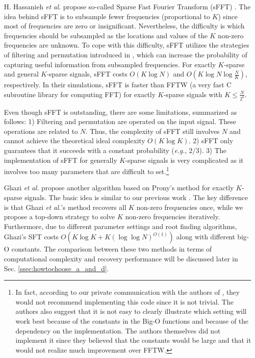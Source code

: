\documentclass[journal,onecolumn,11pt]{IEEEtran}
\begin{document}
H. Hassanieh {\em et al.} propose so-called Sparse Fast Fourier Transform (sFFT) \cite{Haitham2012}\cite{Haitham2012_1}. The idea behind sFFT is to subsample fewer frequencies (proportional to $K$) since most of frequencies are zero or insignificant.
Nevertheless, the difficulty is which frequencies should be subsampled as the locations and values of the $K$ non-zero frequencies are unknown. To cope with this difficulty, sFFT utilizes the strategies of filtering and permutation introduced in \cite{Gilbert2005}, which can increase the probability of capturing useful information from subsampled frequencies.
For exactly $K$-sparse and general $K$-sparse signals, sFFT costs $O (K \log N)$ and $O (K \log N \log \frac{N}{K})$, respectively.
In their simulations, sFFT is faster than FFTW \cite{Frigo2005} (a very fast C subroutine library for computing FFT) for exactly $K$-sparse signals with $K\leq\frac{N}{2^{6}}$.


Even though sFFT \cite{Haitham2012}\cite{Haitham2012_1} is outstanding, there are some limitations, summarized as follows:
1) Filtering and permutation are operated on the input signal. These operations are related to $N$.
Thus, the complexity of sFFT still involves $N$ and cannot achieve the theoretical ideal complexity $O(K \log K)$.
2) sFFT only guarantees that it succeeds with a constant probability ({\em e.g.}, $2/3$).
3) The implementation of sFFT for generally $K$-sparse signals is very complicated as it involves too many parameters that are difficult to set.\footnote{In fact, according to our private communication with the authors of \cite{Haitham2012}\cite{Haitham2012_1}, they would not recommend implementing this code since it is not trivial. The authors also suggest that it is not easy to clearly illustrate which setting will work best because of the constants in the Big-O functions and because of the dependency on the implementation. The authors themselves did not implement it since they believed that the constants would be large and that it would not realize much improvement over FFTW.}

Ghazi {\em et al.} \cite{Ghazi2013} propose another algorithm based on Prony's method for exactly $K$-sparse signals.
The basic idea is similar to our previous work \cite{Hsieh2013}.
The key difference is that Ghazi {\em et al.}'s method recovers all $K$ non-zero frequencies once, while we propose a top-down strategy to solve $K$ non-zero frequencies iteratively. Furthermore, due to different parameter settings and root finding algorithms, Ghazi's SFT costs $O(K \log K+K(\log\log N)^{O(1)})$ along with different big-O constants. The comparison between these two methods in terms of computational complexity and recovery performance will be discussed later in Sec. \ref{ssec:howtochoose_a_and_d}.
\end{document}
